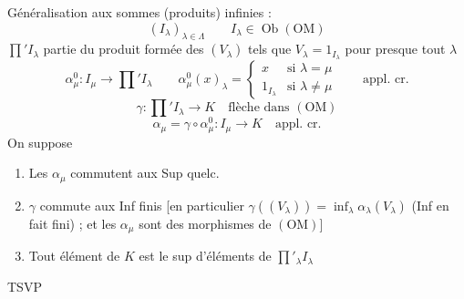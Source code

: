 \documentclass[11pt,a4paper]{article}
\begin{document}
Généralisation aux sommes (produits) infinies :
\[
  (I_\lambda)_{\lambda \in \Lambda} \qquad I_\lambda \in \operatorname{Ob}(\mathrm{OM})
\]
$\prod' I_\lambda$ partie du produit formée des $(V_\lambda)$ tels que $V_\lambda = 1_{I_\lambda}$ pour presque tout $\lambda$
\[
  \alpha^{0}_{\mu} : I_\mu \longrightarrow \prod{}' I_\lambda \qquad \alpha^{0}_{\mu}(x)_\lambda = \begin{cases} x & \text{si } \lambda = \mu \\ 1_{I_\lambda} & \text{si } \lambda \neq \mu \end{cases} \qquad \text{appl. cr.}
\]
\[
  \gamma : \prod{}' I_\lambda \longrightarrow K \quad \text{flèche dans } (\mathrm{OM})
\]
\[
  \alpha_\mu = \gamma \circ \alpha^{0}_{\mu} : I_\mu \to K \quad \text{appl. cr.}
\]
On suppose
\begin{enumerate}
  \item[a)] Les $\alpha_\mu$ commutent aux Sup quelc.
  \item[b)] $\gamma$ commute aux Inf finis [en particulier $\gamma((V_\lambda)) = \inf_\lambda \alpha_\lambda(V_\lambda)$ (Inf en fait fini) ; et les $\alpha_\mu$ sont des morphismes de $(\mathrm{OM})$]
  \item[c)] Tout élément de $K$ est le sup d'éléments de $\prod'_\lambda I_\lambda$
\end{enumerate}
TSVP
\end{document}
